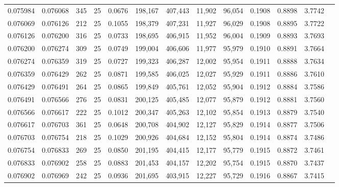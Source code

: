 \begin{tabular}{rrrrrrrrrrrrr}
0.075984 & 0.076068 &   345 &  25 &                                     0.0676 & 198,167 & 407,443 &  11,902 &  96,054 & 0.1908 & 0.8898 & 3.7742 \\
0.076069 & 0.076126 &   212 &  25 &                                     0.1055 & 198,379 & 407,231 &  11,927 &  96,029 & 0.1908 & 0.8895 & 3.7722 \\
0.076126 & 0.076200 &   316 &  25 &                                     0.0733 & 198,695 & 406,915 &  11,952 &  96,004 & 0.1909 & 0.8893 & 3.7693 \\
0.076200 & 0.076274 &   309 &  25 &                                     0.0749 & 199,004 & 406,606 &  11,977 &  95,979 & 0.1910 & 0.8891 & 3.7664 \\
0.076274 & 0.076359 &   319 &  25 &                                     0.0727 & 199,323 & 406,287 &  12,002 &  95,954 & 0.1911 & 0.8888 & 3.7634 \\
0.076359 & 0.076429 &   262 &  25 &                                     0.0871 & 199,585 & 406,025 &  12,027 &  95,929 & 0.1911 & 0.8886 & 3.7610 \\
0.076429 & 0.076491 &   264 &  25 &                                     0.0865 & 199,849 & 405,761 &  12,052 &  95,904 & 0.1912 & 0.8884 & 3.7586 \\
0.076491 & 0.076566 &   276 &  25 &                                     0.0831 & 200,125 & 405,485 &  12,077 &  95,879 & 0.1912 & 0.8881 & 3.7560 \\
0.076566 & 0.076617 &   222 &  25 &                                     0.1012 & 200,347 & 405,263 &  12,102 &  95,854 & 0.1913 & 0.8879 & 3.7540 \\
0.076617 & 0.076703 &   361 &  25 &                                     0.0648 & 200,708 & 404,902 &  12,127 &  95,829 & 0.1914 & 0.8877 & 3.7506 \\
0.076703 & 0.076754 &   218 &  25 &                                     0.1029 & 200,926 & 404,684 &  12,152 &  95,804 & 0.1914 & 0.8874 & 3.7486 \\
0.076754 & 0.076833 &   269 &  25 &                                     0.0850 & 201,195 & 404,415 &  12,177 &  95,779 & 0.1915 & 0.8872 & 3.7461 \\
0.076833 & 0.076902 &   258 &  25 &                                     0.0883 & 201,453 & 404,157 &  12,202 &  95,754 & 0.1915 & 0.8870 & 3.7437 \\
0.076902 & 0.076969 &   242 &  25 &                                     0.0936 & 201,695 & 403,915 &  12,227 &  95,729 & 0.1916 & 0.8867 & 3.7415 \\

\end{tabular}
